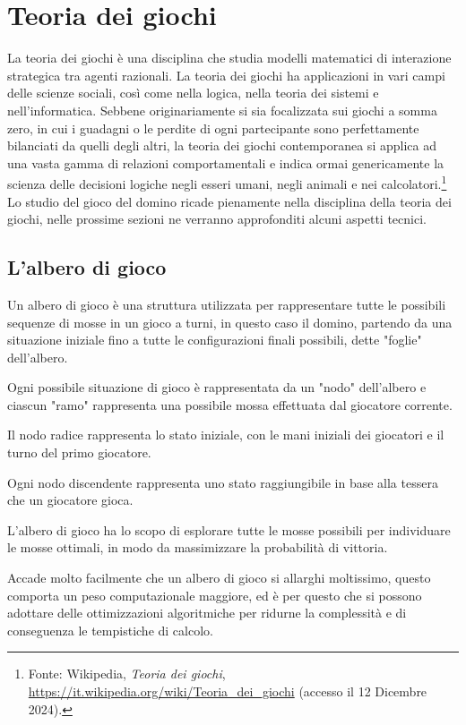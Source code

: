 \documentclass[a4paper,12pt]{report}
\begin{document}
\chapter{Teoria dei giochi}

La teoria dei giochi è una disciplina che studia modelli matematici di interazione strategica tra agenti razionali.
La teoria dei giochi ha applicazioni in vari campi delle scienze sociali, così come nella logica, nella teoria dei sistemi e nell'informatica. 
Sebbene originariamente si sia focalizzata sui giochi a somma zero, in cui i guadagni o le perdite di ogni partecipante sono perfettamente bilanciati da quelli degli altri, la teoria dei giochi contemporanea si applica ad una vasta gamma di relazioni comportamentali 
e indica ormai genericamente la scienza delle decisioni logiche negli esseri umani, negli animali e nei calcolatori.\footnote{Fonte: Wikipedia, \emph{Teoria dei giochi}, \url{https://it.wikipedia.org/wiki/Teoria_dei_giochi} (accesso il 12 Dicembre 2024).}
Lo studio del gioco del domino ricade pienamente nella disciplina della teoria dei giochi, nelle prossime sezioni ne verranno approfonditi alcuni aspetti tecnici.


\section{L'albero di gioco}

Un albero di gioco è una struttura utilizzata per rappresentare tutte le possibili sequenze di mosse in un gioco a turni, in questo caso il domino, partendo da una situazione iniziale fino a tutte le configurazioni finali possibili, dette "foglie" dell'albero. 

Ogni possibile situazione di gioco è rappresentata da un "nodo" dell'albero e ciascun "ramo" rappresenta una possibile mossa effettuata dal giocatore corrente.

Il nodo radice rappresenta lo stato iniziale, con le mani iniziali dei giocatori e il turno del primo giocatore. 

Ogni nodo discendente rappresenta uno stato raggiungibile in base alla tessera che un giocatore gioca.

L’albero di gioco ha lo scopo di esplorare tutte le mosse possibili per individuare le mosse ottimali, in modo da massimizzare la probabilità di vittoria. 

Accade molto facilmente che un albero di gioco si allarghi moltissimo, questo comporta un peso computazionale maggiore, ed è per questo che si possono adottare delle ottimizzazioni algoritmiche per ridurne la complessità e di conseguenza le tempistiche di calcolo.
\end{document}

